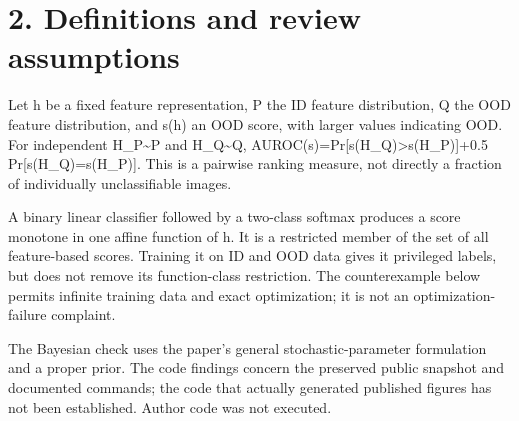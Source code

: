 \documentclass[10pt]{article}
\begin{document}
\section*{2. Definitions and review assumptions}
Let h be a fixed feature representation, P the ID feature distribution, Q the OOD feature distribution, and s(h) an OOD score, with larger values indicating OOD. For independent H\_P\textasciitilde{}P and H\_Q\textasciitilde{}Q, AUROC(s)=Pr[s(H\_Q)>s(H\_P)]+0.5 Pr[s(H\_Q)=s(H\_P)]. This is a pairwise ranking measure, not directly a fraction of individually unclassifiable images.\par
A binary linear classifier followed by a two-class softmax produces a score monotone in one affine function of h. It is a restricted member of the set of all feature-based scores. Training it on ID and OOD data gives it privileged labels, but does not remove its function-class restriction. The counterexample below permits infinite training data and exact optimization; it is not an optimization-failure complaint.\par
The Bayesian check uses the paper’s general stochastic-parameter formulation and a proper prior. The code findings concern the preserved public snapshot and documented commands; the code that actually generated published figures has not been established. Author code was not executed.\par
\end{document}
